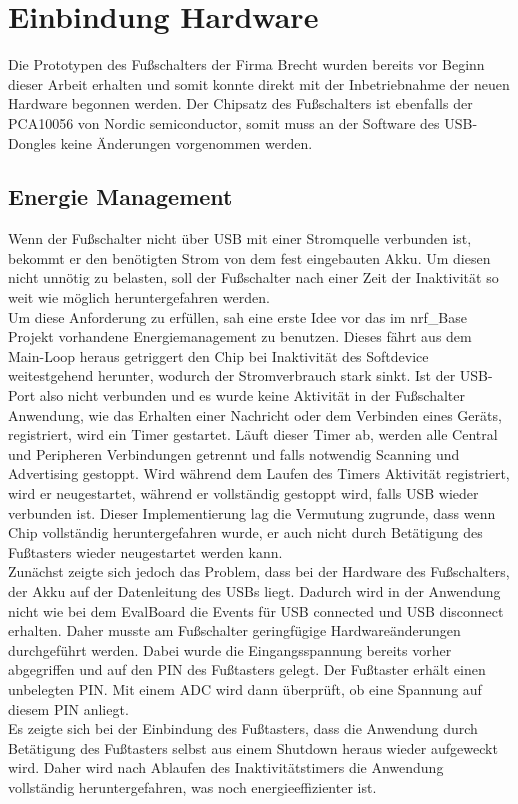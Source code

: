 \section{Einbindung Hardware}
Die Prototypen des Fußschalters der Firma Brecht wurden bereits vor Beginn dieser Arbeit erhalten und somit konnte direkt mit der Inbetriebnahme der neuen Hardware begonnen werden. Der Chipsatz des Fußschalters ist ebenfalls der PCA10056 von Nordic semiconductor, somit muss an der Software des USB-Dongles keine Änderungen vorgenommen werden.

\subsection{Energie Management}
Wenn der Fußschalter nicht über USB mit einer Stromquelle verbunden ist, bekommt er den benötigten Strom von dem fest eingebauten Akku. Um diesen nicht unnötig zu belasten, soll der Fußschalter nach einer Zeit der Inaktivität so weit wie möglich heruntergefahren werden.\\
Um diese Anforderung zu erfüllen, sah eine erste Idee vor das im nrf\_Base Projekt vorhandene Energiemanagement zu benutzen. Dieses fährt aus dem Main-Loop heraus getriggert den Chip bei Inaktivität des Softdevice weitestgehend herunter, wodurch der Stromverbrauch stark sinkt. Ist der USB-Port also nicht verbunden und es wurde keine Aktivität in der Fußschalter Anwendung, wie das Erhalten einer Nachricht oder dem Verbinden eines Geräts, registriert, wird ein Timer gestartet. Läuft dieser Timer ab, werden alle Central und Peripheren Verbindungen getrennt und falls notwendig Scanning und Advertising gestoppt. Wird während dem Laufen des Timers Aktivität registriert, wird er neugestartet, während er vollständig gestoppt wird, falls USB wieder verbunden ist. Dieser Implementierung lag die Vermutung zugrunde, dass wenn Chip vollständig heruntergefahren wurde, er auch nicht durch Betätigung des Fußtasters wieder neugestartet werden kann.\\
Zunächst zeigte sich jedoch das Problem, dass bei der Hardware des Fußschalters, der Akku auf der Datenleitung des USBs liegt. Dadurch wird in der Anwendung nicht wie bei dem EvalBoard die Events für USB connected und USB disconnect erhalten. Daher musste am Fußschalter geringfügige Hardwareänderungen durchgeführt werden. Dabei wurde die Eingangsspannung bereits vorher abgegriffen und auf den PIN des Fußtasters gelegt. Der Fußtaster erhält einen unbelegten PIN. Mit einem ADC wird dann überprüft, ob eine Spannung auf diesem PIN anliegt.\\
Es zeigte sich bei der Einbindung des Fußtasters, dass die Anwendung durch Betätigung des Fußtasters selbst aus einem Shutdown heraus wieder aufgeweckt wird. Daher wird nach Ablaufen des Inaktivitätstimers die Anwendung vollständig heruntergefahren, was noch energieeffizienter ist.


